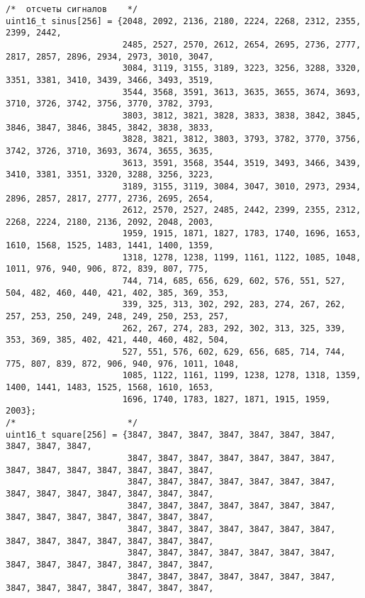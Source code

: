 \begin{code}
\begin{verbatim}
/*  отсчеты сигналов    */
uint16_t sinus[256] = {2048, 2092, 2136, 2180, 2224, 2268, 2312, 2355, 2399, 2442,
                       2485, 2527, 2570, 2612, 2654, 2695, 2736, 2777, 2817, 2857, 2896, 2934, 2973, 3010, 3047,
                       3084, 3119, 3155, 3189, 3223, 3256, 3288, 3320, 3351, 3381, 3410, 3439, 3466, 3493, 3519,
                       3544, 3568, 3591, 3613, 3635, 3655, 3674, 3693, 3710, 3726, 3742, 3756, 3770, 3782, 3793,
                       3803, 3812, 3821, 3828, 3833, 3838, 3842, 3845, 3846, 3847, 3846, 3845, 3842, 3838, 3833,
                       3828, 3821, 3812, 3803, 3793, 3782, 3770, 3756, 3742, 3726, 3710, 3693, 3674, 3655, 3635,
                       3613, 3591, 3568, 3544, 3519, 3493, 3466, 3439, 3410, 3381, 3351, 3320, 3288, 3256, 3223,
                       3189, 3155, 3119, 3084, 3047, 3010, 2973, 2934, 2896, 2857, 2817, 2777, 2736, 2695, 2654,
                       2612, 2570, 2527, 2485, 2442, 2399, 2355, 2312, 2268, 2224, 2180, 2136, 2092, 2048, 2003,
                       1959, 1915, 1871, 1827, 1783, 1740, 1696, 1653, 1610, 1568, 1525, 1483, 1441, 1400, 1359,
                       1318, 1278, 1238, 1199, 1161, 1122, 1085, 1048, 1011, 976, 940, 906, 872, 839, 807, 775,
                       744, 714, 685, 656, 629, 602, 576, 551, 527, 504, 482, 460, 440, 421, 402, 385, 369, 353,
                       339, 325, 313, 302, 292, 283, 274, 267, 262, 257, 253, 250, 249, 248, 249, 250, 253, 257,
                       262, 267, 274, 283, 292, 302, 313, 325, 339, 353, 369, 385, 402, 421, 440, 460, 482, 504,
                       527, 551, 576, 602, 629, 656, 685, 714, 744, 775, 807, 839, 872, 906, 940, 976, 1011, 1048,
                       1085, 1122, 1161, 1199, 1238, 1278, 1318, 1359, 1400, 1441, 1483, 1525, 1568, 1610, 1653,
                       1696, 1740, 1783, 1827, 1871, 1915, 1959, 2003};
/*                      */
uint16_t square[256] = {3847, 3847, 3847, 3847, 3847, 3847, 3847, 3847, 3847, 3847,
                        3847, 3847, 3847, 3847, 3847, 3847, 3847, 3847, 3847, 3847, 3847, 3847, 3847, 3847,
                        3847, 3847, 3847, 3847, 3847, 3847, 3847, 3847, 3847, 3847, 3847, 3847, 3847, 3847,
                        3847, 3847, 3847, 3847, 3847, 3847, 3847, 3847, 3847, 3847, 3847, 3847, 3847, 3847,
                        3847, 3847, 3847, 3847, 3847, 3847, 3847, 3847, 3847, 3847, 3847, 3847, 3847, 3847,
                        3847, 3847, 3847, 3847, 3847, 3847, 3847, 3847, 3847, 3847, 3847, 3847, 3847, 3847,
                        3847, 3847, 3847, 3847, 3847, 3847, 3847, 3847, 3847, 3847, 3847, 3847, 3847, 3847,

\end{verbatim}
\end{code}
